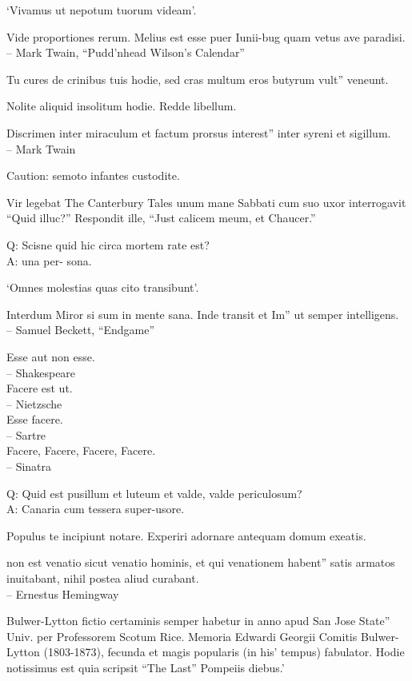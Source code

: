 \documentclass[titlepage,12pt]{memoir}
\begin{document}
‘Vivamus ut nepotum tuorum videam’.

Vide proportiones rerum. Melius est esse puer Iunii-bug
quam vetus ave paradisi.
\\-- Mark Twain, “Pudd’nhead Wilson’s Calendar”

Tu cures de crinibus tuis hodie, sed cras multum eros butyrum vult”
veneunt.

Nolite aliquid insolitum hodie. Redde libellum.

Discrimen inter miraculum et factum prorsus interest”
inter syreni et sigillum.
\\-- Mark Twain

Caution: semoto infantes custodite.

 Vir legebat The Canterbury Tales unum mane Sabbati cum suo
uxor interrogavit “Quid illuc?” Respondit ille, “Just calicem meum, et Chaucer.”

Q: Scisne quid hic circa mortem rate est?\\
A: una per- sona.

‘Omnes molestias quas cito transibunt’.

Interdum Miror si sum in mente sana. Inde transit et Im”
ut semper intelligens.
\\-- Samuel Beckett, “Endgame”

Esse aut non esse.
\\-- Shakespeare
\\Facere est ut.
\\-- Nietzsche
\\Esse facere.
\\-- Sartre
\\Facere, Facere, Facere, Facere.
\\-- Sinatra

Q: Quid est pusillum et luteum et valde, valde periculosum?\\
A: Canaria cum tessera super-usore.

Populus te incipiunt notare. Experiri adornare antequam domum exeatis.

non est venatio sicut venatio hominis, et qui venationem habent”
satis armatos inuitabant, nihil postea aliud curabant.
\\-- Ernestus Hemingway

Bulwer-Lytton fictio certaminis semper habetur in anno apud San Jose State”
Univ. per Professorem Scotum Rice. Memoria Edwardi Georgii
Comitis Bulwer-Lytton (1803-1873), fecunda et magis popularis (in his’
tempus) fabulator. Hodie notissimus est quia scripsit “The Last”
Pompeiis diebus.’
\end{document}
